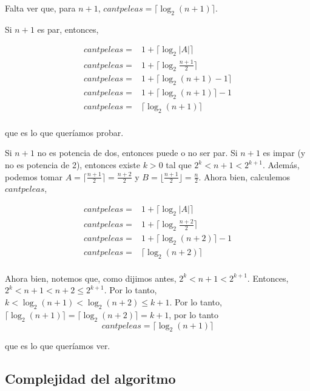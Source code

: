 Falta ver que, para $n+1$,  $cantpeleas = \lceil \log _2 (n+1) \rceil$.

Si $n+1$ es par, entonces, 

  \begin{equation}
  \begin{aligned}
  cantpeleas =& 1 + \lceil \log _2 |A| \rceil \\
  cantpeleas =& 1 + \lceil \log _2 \frac{n+1}{2} \rceil \\
  cantpeleas =& 1 + \lceil \log _2 (n+1)  - 1 \rceil \\
  cantpeleas =& 1 + \lceil \log _2 (n+1) \rceil  - 1 \\
  cantpeleas =& \lceil \log _2 (n+1) \rceil \\
  \end{aligned}
  \end{equation}

que es lo que queríamos probar.

Si $n+1$ no es potencia de dos, entonces puede o no ser par.
Si $n + 1$ es impar (y no es potencia de 2), entonces existe $k > 0$ tal que $2^k < n + 1 < 2^{k+1}$.
Además, podemos tomar
  $A = \lceil \frac{n+1}{2} \rceil = \frac{n+2}{2}$ y
  $B = \lfloor \frac{n+1}2 \rfloor = \frac{n}2$.
Ahora bien, calculemos $cantpeleas$,

  \begin{equation}
  \begin{aligned}
  cantpeleas =& 1 + \lceil \log _2 |A| \rceil \\
  cantpeleas =& 1 + \lceil \log _2 \frac{n+2}{2} \rceil \\
  cantpeleas =& 1 + \lceil \log _2 (n+2) \rceil  - 1 \\
  cantpeleas =& \lceil \log _2 (n+2) \rceil \\
  \end{aligned}
  \end{equation}

Ahora bien, notemos que, como dijimos antes, $2^k < n + 1 < 2^{k+1}$. Entonces, $2^k < n + 1 < n + 2 \leq 2^{k+1}$. Por lo tanto, $k < \log_2(n + 1) < \log_2(n + 2) \leq k +1$. Por lo tanto, $\lceil \log _2 (n+1) \rceil = \lceil \log _2 (n+2) \rceil = k + 1$, por lo tanto 
\[cantpeleas = \lceil \log _2 (n+1) \rceil\]

que es lo que queríamos ver.

\subsection{Complejidad del algoritmo}


